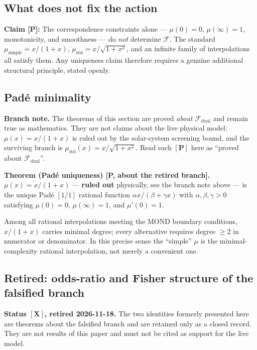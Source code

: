 \documentclass[aps,prd,preprint,superscriptaddress,nofootinbib,amsmath,amssymb,floatfix]{revtex4-2}
\makeatletter
\DeclareRobustCommand{\_}{%
    \ifmmode\nfss@text{\textunderscore}\else\textunderscore\penalty\z@\fi}%
\makeatother
\begin{document}
\subsection{What does not fix the action}

\textbf{Claim [P]:} The correspondence constraints alone --- $\mu(0)=0$, $\mu(\infty)=1$, monotonicity, and smoothness --- do \emph{not} determine $\mathcal{F}$. The standard $\mu_{\text{simple}} = x/(1+x)$, $\mu_{\text{std}} = x/\sqrt{1+x^2}$, and an infinite family of interpolations all satisfy them. Any uniqueness claim therefore requires a genuine additional structural principle, stated openly.

\subsection{Pad\'e minimality}

\medskip\noindent\textbf{Branch note.} The theorems of this section are proved
\emph{about} $\mathcal{F}_{\text{dual}}$ and remain true as mathematics. They are
not claims about the live physical model: $\mu(x) = x/(1+x)$ is ruled out by the
solar-system screening bound, and the surviving branch is
$\mu_{\text{std}}(x) = x/\sqrt{1+x^2}$. Read each $\mathbf{[P]}$ here as
``proved about $\mathcal{F}_{\text{dual}}$''.\medskip

\textbf{Theorem (Pad\'e uniqueness) [P, about the retired branch].} $\mu(x) = x/(1+x)$ — \textbf{ruled out} physically, see the branch note above — is the unique Pad\'e $[1/1]$ rational function $\alpha x/(\beta + \gamma x)$ with $\alpha,\beta,\gamma>0$ satisfying $\mu(0)=0$, $\mu(\infty)=1$, and $\mu'(0)=1$.

Among all rational interpolations meeting the MOND boundary conditions, $x/(1+x)$ carries minimal degree; every alternative requires degree $\ge 2$ in numerator or denominator. In this precise sense the ``simple'' $\mu$ is the minimal-complexity rational interpolation, not merely a convenient one.

\subsection{Retired: odds-ratio and Fisher structure of the falsified branch}
\label{sec:retired-odds-fisher}

\textbf{Status $\mathbf{[X]}$, retired 2026-11-18.} The two identities formerly presented here are theorems about the falsified branch and are retained only as a closed record. They are not results of this paper and must not be cited as support for the live model.
\end{document}
